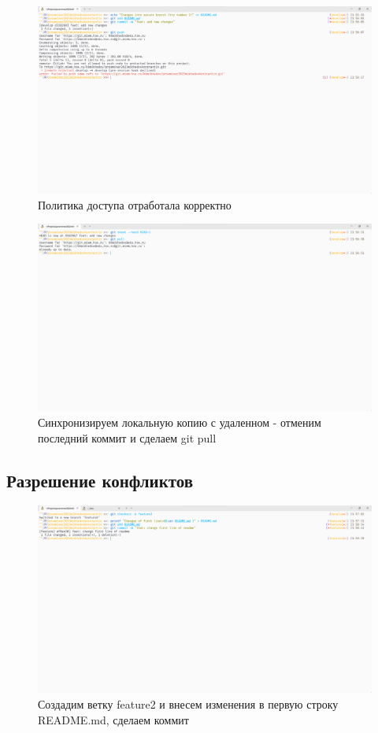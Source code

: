 \documentclass[a4paper]{article}
\begin{document}
  \begin{figure}[H]
    \centering
    \includegraphics[width=\textwidth]{1_ (29)}
    \caption{Политика доступа отработала корректно}
  \end{figure}

  \begin{figure}[H]
    \centering
    \includegraphics[width=\textwidth]{1_ (28)}
    \caption{Синхронизируем локальную копию с удаленном - отменим последний коммит и сделаем git pull}
  \end{figure}

  \subsection{Разрешение конфликтов}

  \begin{figure}[H]
    \centering
    \includegraphics[width=\textwidth]{1_ (27)}
    \caption{Создадим ветку feature2 и внесем изменения в первую строку README.md, сделаем коммит}
  \end{figure}
\end{document}
